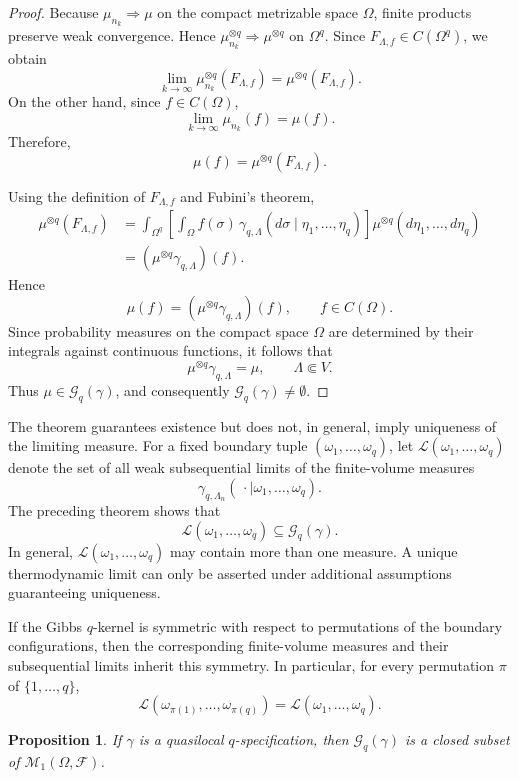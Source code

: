 \documentclass[11pt,reqno]{amsart}
\newtheorem{pro}{Proposition}
\numberwithin{equation}{section} \setcounter{tocdepth}{1}
\begin{document}
\begin{proof}
	Because $
	\mu_{n_k}\Longrightarrow\mu
	$
	on the compact metrizable space $\Omega$, finite products preserve weak
	convergence. Hence $\mu_{n_k}^{\otimes q}
	\Longrightarrow
	\mu^{\otimes q}$ on $\Omega^q.$
	Since $F_{\Lambda,f}\in C(\Omega^q)$, we obtain
	\[
	\lim_{k\to\infty}
	\mu_{n_k}^{\otimes q}
	\left(
	F_{\Lambda,f}
	\right)
	=
	\mu^{\otimes q}
	\left(
	F_{\Lambda,f}
	\right).
	\]
	On the other hand, since $f\in C(\Omega)$,
	\[
	\lim_{k\to\infty}\mu_{n_k}(f)
	=
	\mu(f).
	\]
	Therefore,
	\[
	\mu(f)
	=
	\mu^{\otimes q}
	\left(
	F_{\Lambda,f}
	\right).
	\]
	
	Using the definition of $F_{\Lambda,f}$ and Fubini's theorem,
	\[
	\begin{aligned}
		\mu^{\otimes q}
		\left(
		F_{\Lambda,f}
		\right)
		&=
		\int_{\Omega^q}
		\left[
		\int_\Omega
		f(\sigma)\,
		\gamma_{q,\Lambda}
		(d\sigma\mid\eta_1,\ldots,\eta_q)
		\right]
		\mu^{\otimes q}
		(d\eta_1,\ldots,d\eta_q)
		\\
		&=
		\left(
		\mu^{\otimes q}\gamma_{q,\Lambda}
		\right)(f).
	\end{aligned}
	\]
	Hence
	\[
	\mu(f)
	=
	\left(
	\mu^{\otimes q}\gamma_{q,\Lambda}
	\right)(f),
	\qquad
	f\in C(\Omega).
	\]
	Since probability measures on the compact space $\Omega$ are
	determined by their integrals against continuous functions, it follows
	that
		\[
	\mu^{\otimes q}\gamma_{q,\Lambda}
	=
	\mu,
	\qquad
	\Lambda\Subset V.
	\]
	Thus $\mu\in\mathcal G_q(\gamma)$, 	and consequently
	$\mathcal G_q(\gamma)\neq\emptyset$.
\end{proof}

The theorem guarantees existence but does not, in general, imply
uniqueness of the limiting measure. For a fixed boundary tuple
$(\omega_1,\ldots,\omega_q)$, let
$
\mathcal L(\omega_1,\ldots,\omega_q)
$
denote the set of all weak subsequential limits of the finite-volume
measures
\[
\gamma_{q,\Lambda_n}
(\,\cdot\mid\omega_1,\ldots,\omega_q).
\]
The preceding theorem shows that
\[
\mathcal L(\omega_1,\ldots,\omega_q)
\subseteq
\mathcal G_q(\gamma).
\]
In general, $\mathcal L(\omega_1,\ldots,\omega_q)$ may contain more than
one measure. A unique thermodynamic limit can only be asserted under
additional assumptions guaranteeing uniqueness.

If the Gibbs $q$-kernel is symmetric with respect to permutations of the
boundary configurations, then the corresponding finite-volume measures
and their subsequential limits inherit this symmetry. In particular,
for every permutation $\pi$ of $\{1,\ldots,q\}$,
\[
\mathcal L(\omega_{\pi(1)},\ldots,\omega_{\pi(q)})
=
\mathcal L(\omega_1,\ldots,\omega_q).
\]
\begin{pro}
	If $\gamma$ is a quasilocal $q$-specification, then
	$\mathcal G_q(\gamma)$ is a closed subset of
	$\mathcal M_1(\Omega,\mathcal F)$.
\end{pro}
\end{document}
